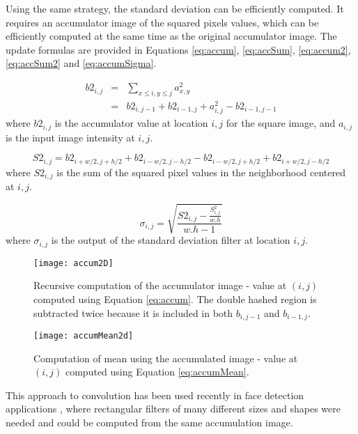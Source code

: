 \documentclass{InsightArticle}
\begin{document}
Using the same strategy, the standard deviation can be efficiently
computed.  It requires an accumulator image of the squared pixels
values, which can be efficiently computed at the same time as the
original accumulator image. The update formulas are provided in
Equations \ref{eq:accum}, \ref{eq:accSum},
\ref{eq:accum2}, \ref{eq:accSum2} and \ref{eq:accumSigma}.

\begin{eqnarray}
\label{eq:accum2}
b2_{i,j} & = & \sum_{x \leq i, y \leq j} a_{x,y}^2 \\ \nonumber
	& = & b2_{i,j-1} + b2_{i-1, j} + a_{i,j}^2 - b2_{i-1, j-1}
\end{eqnarray}
where $b2_{i,j}$ is the accumulator value at location $i,j$ for the square image, and $a_{i,j}$ is the input image intensity at $i,j$.

\begin{equation}
\label{eq:accSum2}
S2_{i,j} = b2_{i+w/2,j+h/2} + b2_{i-w/2,j-h/2} - b2_{i-w/2,j+h/2} + b2_{i+w/2,j-h/2}
\end{equation}
where $S2_{i,j}$ is the sum of the squared pixel values in the neighborhood centered at $i,j$.

\begin{equation}
\label{eq:accumSigma}
\sigma_{i,j} = \sqrt{\frac{S2_{i,j} - \frac{S_{i,j}^2}{w.h}}{w.h-1}}
\end{equation}
where $\sigma_{i,j}$ is the output of the standard deviation filter at location $i,j$.

\begin{figure}[htbp]
\centering
\texttt{[image: accum2D]}
\caption{Recursive computation of the accumulator image - value at $(i,j)$ computed using Equation \ref{eq:accum}. The double hashed region is subtracted twice because it is included in both $b_{i,j-1}$ and $b_{i-1, j}$.\label{fig:accum}}
\end{figure}

\begin{figure}[htbp]
\centering
\texttt{[image: accumMean2d]}
\caption{Computation of mean using the accumulated image - value at $(i,j)$ computed using Equation \ref{eq:accumMean}.\label{fig:accumMean}}
\end{figure}

This approach to convolution has been used recently in face detection
applications \cite{Viola2004}, where rectangular filters of many
different sizes and shapes were needed and could be computed from the same accumulation image.
\end{document}
